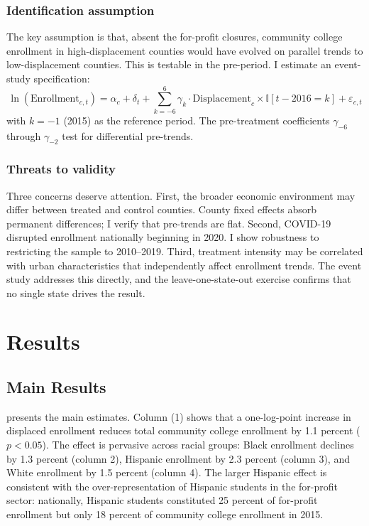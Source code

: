 \documentclass[12pt]{article}
\newcommand{\ind}{\mathbb{I}}
\begin{document}
\subsubsection*{Identification assumption} The key assumption is that, absent the for-profit closures, community college enrollment in high-displacement counties would have evolved on parallel trends to low-displacement counties. This is testable in the pre-period. I estimate an event-study specification:
\begin{equation}
\ln(\text{Enrollment}_{c,t}) = \alpha_c + \delta_t + \sum_{k=-6}^{6} \gamma_k \cdot \text{Displacement}_c \times \ind[t - 2016 = k] + \varepsilon_{c,t}
\label{eq:eventstudy}
\end{equation}
with $k = -1$ (2015) as the reference period. The pre-treatment coefficients $\gamma_{-6}$ through $\gamma_{-2}$ test for differential pre-trends.

\subsubsection*{Threats to validity} Three concerns deserve attention. First, the broader economic environment may differ between treated and control counties. County fixed effects absorb permanent differences; I verify that pre-trends are flat. Second, COVID-19 disrupted enrollment nationally beginning in 2020. I show robustness to restricting the sample to 2010--2019. Third, treatment intensity may be correlated with urban characteristics that independently affect enrollment trends. The event study addresses this directly, and the leave-one-state-out exercise confirms that no single state drives the result.

\section{Results}

\subsection{Main Results}

 presents the main estimates. Column (1) shows that a one-log-point increase in displaced enrollment reduces total community college enrollment by 1.1 percent ($p < 0.05$). The effect is pervasive across racial groups: Black enrollment declines by 1.3 percent (column 2), Hispanic enrollment by 2.3 percent (column 3), and White enrollment by 1.5 percent (column 4). The larger Hispanic effect is consistent with the over-representation of Hispanic students in the for-profit sector: nationally, Hispanic students constituted 25 percent of for-profit enrollment but only 18 percent of community college enrollment in 2015.
\end{document}
